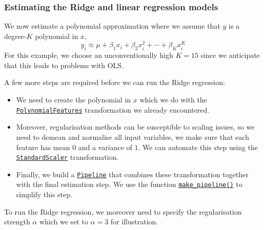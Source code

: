 \documentclass{scrartcl}
\providecommand{\tightlist}{%
      \setlength{\itemsep}{0pt}\setlength{\parskip}{0pt}}
\begin{document}
    \hypertarget{estimating-the-ridge-and-linear-regression-models}{%
\subsubsection*{Estimating the Ridge and linear regression
models}\label{estimating-the-ridge-and-linear-regression-models}}

We now estimate a polynomial approximation where we assume that \(y\) is
a degree-\(K\) polynomial in \(x\), \ie \[
y_i \approx \mu + \beta_1 x_i + \beta_2 x_i^2 + \cdots + \beta_K x_i^K 
\] For this example, we choose an unconventionally high \(K=15\) since
we anticipate that this leads to problems with OLS.

A few more steps are required before we can run the Ridge regression:

\begin{itemize}
\tightlist
\item
  We need to create the polynomial in \(x\) which we do with the
  \href{https://scikit-learn.org/stable/modules/generated/sklearn.preprocessing.PolynomialFeatures.html}{\texttt{PolynomialFeatures}}
  transformation we already encountered.
\item
  Moreover, regularisation methods can be susceptible to scaling issues,
  so we need to demean and normalise all input variables, \ie we make
  sure that each feature has mean \(0\) and a variance of \(1\). We can
  automate this step using the
  \href{https://scikit-learn.org/stable/modules/generated/sklearn.preprocessing.StandardScaler.html}{\texttt{StandardScaler}}
  transformation.
\item
  Finally, we build a
  \href{https://scikit-learn.org/stable/modules/generated/sklearn.pipeline.Pipeline.html}{\texttt{Pipeline}}
  that combines these transformation together with the final estimation
  step. We use the function
  \href{https://scikit-learn.org/stable/modules/generated/sklearn.pipeline.make_pipeline.html}{\texttt{make\_pipeline()}}
  to simplify this step.
\end{itemize}

To run the Ridge regression, we moreover need to specify the
regularisation strength \(\alpha\) which we set to \(\alpha = 3\) for
illustration.
\end{document}
